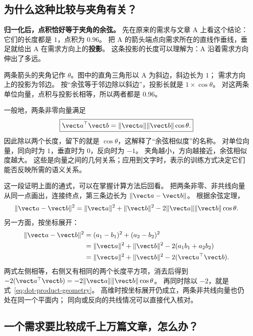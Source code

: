 \subsection{为什么这种比较与夹角有关？}

\textbf{归一化后，点积恰好等于夹角的余弦。}
先在原来的需求与文章 A 上看这个结论：它们的长度都是 $1$，点积为 $0.96$。
把 A 的箭头端点向需求所在的直线作垂线，垂足就给出 A 在需求方向上的\textbf{投影}。
这条投影的长度可以理解为：A 沿着需求方向伸出了多远。


两条箭头的夹角记作 $\theta$。图中的直角三角形以 A 为斜边，斜边长为 $1$；
需求方向上的投影为邻边。
按“余弦等于邻边除以斜边”，投影长就是 $1\times\cos\theta$。
对这两条单位向量，点积与投影长相等，所以两者都是 $0.96$。

一般地，两条非零向量满足
\begin{equation}
\boxed{\vect a^\top\vect b=\|\vect a\|\|\vect b\|\cos\theta.}
\label{eq:dot-product-geometry}
\end{equation}
因此除以两个长度，留下的就是 $\cos\theta$，这解释了“余弦相似度”的名称。
对单位向量，同向时为 $1$，垂直时为 $0$，反向时为 $-1$。
夹角越小，方向越接近，余弦相似度越大。
这些是向量之间的几何关系；应用到文字时，表示的训练方式决定它们能否反映所需的语义关系。

\begin{example}[title={{\symboliconfont ★} 为什么坐标计算与几何解释一致？}]
这一段证明上面的通式，可以在掌握计算方法后回看。
把两条非零、非共线向量从同一点画出，连接终点，第三条边长为 $\|\vect a-\vect b\|$。
根据余弦定理，
\begin{equation}
\|\vect a-\vect b\|^2
=\|\vect a\|^2+\|\vect b\|^2
-2\|\vect a\|\|\vect b\|\cos\theta.
\label{eq:cosine-law}
\end{equation}
另一方面，按坐标展开：
\[\begin{aligned}
\|\vect a-\vect b\|^2
&=(a_1-b_1)^2+(a_2-b_2)^2\\
&=\|\vect a\|^2+\|\vect b\|^2
-2(a_1b_1+a_2b_2)\\
&=\|\vect a\|^2+\|\vect b\|^2-2(\vect a^\top\vect b).
\end{aligned}\]
两式左侧相等，右侧又有相同的两个长度平方项，消去后得到
$-2(\vect a^\top\vect b)=-2\|\vect a\|\|\vect b\|\cos\theta$。
再同时除以 $-2$，就是式~\eqref{eq:dot-product-geometry}。
高维时按坐标展开仍成立，两条非共线向量也仍处在同一个平面内；
同向或反向的共线情况可以直接代入核对。
\end{example}

\subsection{一个需求要比较成千上万篇文章，怎么办？}

